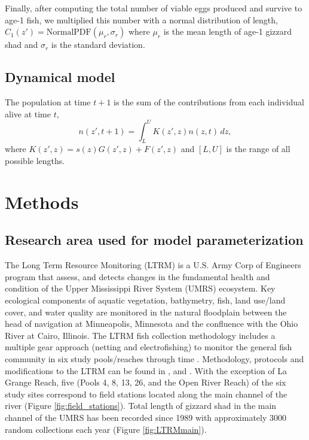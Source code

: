 \documentclass[preprint,review,12pt,authoryear]{elsarticle}
\def\ds{\displaystyle}
\begin{document}
Finally, after computing the total number of viable eggs produced and survive to age-1 fish, we multiplied this number with a normal distribution of length,
$ \ds C_1 (z') =  \mathrm{Normal PDF} (\mu_r, \sigma_r)$ where $\mu_r$ is the mean length of age-1 gizzard shad and $\sigma_r$ is the standard deviation. 

\subsection{Dynamical model} 
The population at time $t+1$ is the sum of the contributions from each individual alive at time $t$,
\begin{equation}\label{eq:IPM}
n(z',t+1) = \int_L^U K(z',z)n(z,t) \,dz,
\end{equation}  
where $K(z',z) = s(z) G(z',z) + F(z',z)$ and $[L,U]$ is the range of all possible lengths.

\section{Methods}
\subsection{Research area used for model parameterization}
The Long Term Resource Monitoring (LTRM) is a U.S. Army Corp of Engineers program that assess, and detects changes in the fundamental health and condition of the Upper Mississippi River System (UMRS) ecosystem.  
Key ecological components of aquatic vegetation, bathymetry, fish, land use/land cover, and water quality are monitored in the natural floodplain between the head of navigation at Minneapolis, Minnesota and the confluence with the Ohio River at Cairo, Illinois. 
The LTRM fish collection methodology includes a multiple gear approach (netting and electrofishing) to monitor the general fish community in six study pools/reaches through time \citep{gutreuter1995long}.
Methodology, protocols and modifications to the LTRM can be found in \cite{gutreuter1995long}, and \cite{ickes2002evaluation}. 
With the exception of La Grange Reach, five (Pools 4, 8, 13, 26, and the Open River Reach) of the six study sites correspond to field stations located along the main channel of the river (Figure \ref{fig:field_stations}).
Total length of gizzard shad in the main channel of the UMRS has been recorded since 1989 with approximately 3000 random collections each year (Figure \ref{fig:LTRMmain}). 
\end{document}
